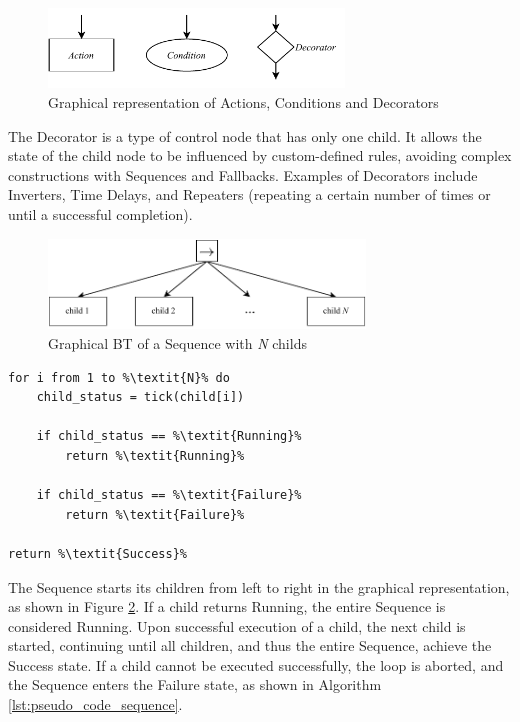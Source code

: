 \begin{figure}[h]
    \centering
    \includegraphics[width=0.7\textwidth]{figures/20_state_of_the_art/bt_types.pdf}
    \caption{Graphical representation of Actions, Conditions and Decorators}
    \label{fig:bt_types}
\end{figure}

The Decorator is a type of control node that has only one child. It allows the state of the child node to be influenced by custom-defined rules, avoiding complex constructions with Sequences and Fallbacks. Examples of Decorators include Inverters, Time Delays, and Repeaters (repeating a certain number of times or until a successful completion).

\begin{figure}[h]
    \centering
    \includegraphics[width=0.75\textwidth]{figures/20_state_of_the_art/sequence.pdf}
    \caption{Graphical BT of a Sequence with \textit{N} childs}
    \label{fig:sequence}
\end{figure}

\begin{lstlisting}[float=h]
for i from 1 to %\textit{N}% do
    child_status = tick(child[i])
    
    if child_status == %\textit{Running}%
        return %\textit{Running}%
        
    if child_status == %\textit{Failure}%
        return %\textit{Failure}%

return %\textit{Success}%
\end{lstlisting}

The Sequence starts its children from left to right in the graphical representation, as shown in Figure \ref{fig:sequence}. If a child returns Running, the entire Sequence is considered Running. Upon successful execution of a child, the next child is started, continuing until all children, and thus the entire Sequence, achieve the Success state. If a child cannot be executed successfully, the loop is aborted, and the Sequence enters the Failure state, as shown in Algorithm \ref{lst:pseudo_code_sequence}.
  

